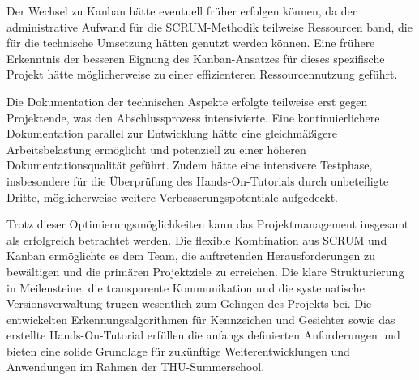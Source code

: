 Der Wechsel zu Kanban hätte eventuell früher erfolgen können, da der administrative Aufwand für die SCRUM-Methodik teilweise Ressourcen band, die für die technische Umsetzung hätten genutzt werden können. Eine frühere Erkenntnis der besseren Eignung des Kanban-Ansatzes für dieses spezifische Projekt hätte möglicherweise zu einer effizienteren Ressourcennutzung geführt.

Die Dokumentation der technischen Aspekte erfolgte teilweise erst gegen Projektende, was den Abschlussprozess intensivierte. Eine kontinuierlichere Dokumentation parallel zur Entwicklung hätte eine gleichmäßigere Arbeitsbelastung ermöglicht und potenziell zu einer höheren Dokumentationsqualität geführt. Zudem hätte eine intensivere Testphase, insbesondere für die Überprüfung des Hands-On-Tutorials durch unbeteiligte Dritte, möglicherweise weitere Verbesserungspotentiale aufgedeckt.

Trotz dieser Optimierungsmöglichkeiten kann das Projektmanagement insgesamt als erfolgreich betrachtet werden. Die flexible Kombination aus SCRUM und Kanban ermöglichte es dem Team, die auftretenden Herausforderungen zu bewältigen und die primären Projektziele zu erreichen. Die klare Strukturierung in Meilensteine, die transparente Kommunikation und die systematische Versionsverwaltung trugen wesentlich zum Gelingen des Projekts bei. Die entwickelten Erkennungsalgorithmen für Kennzeichen und Gesichter sowie das erstellte Hands-On-Tutorial erfüllen die anfangs definierten Anforderungen und bieten eine solide Grundlage für zukünftige Weiterentwicklungen und Anwendungen im Rahmen der THU-Summerschool.